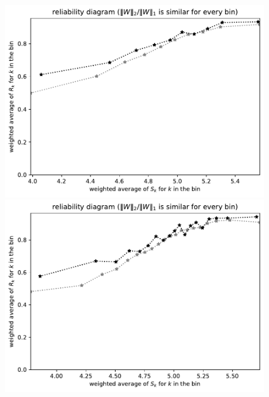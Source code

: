 \documentclass{article}
\begin{document}
\begin{figure}
\begin{centering}
\parbox{\imsize}{\includegraphics[width=\imsize]
{./codes/weighted/County_of_Orange-HISPEED/equierrs10}}
\quad\quad
\parbox{\imsize}{\includegraphics[width=\imsize]
{./codes/weighted/County_of_Orange-HISPEED/equierrs20}}

\vspace{\vertsep}


\end{centering}
\end{figure}
\end{document}
